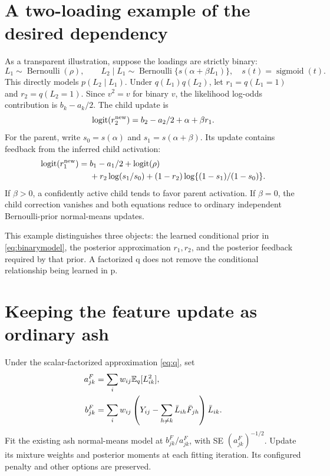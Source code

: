 \documentclass[11pt,a4paper]{article}
\newcommand{\E}{\mathbb E}
\newcommand{\sigmoid}{\operatorname{sigmoid}}
\newcommand{\logit}{\operatorname{logit}}
\begin{document}
\clearpage
\section{A two-loading example of the desired dependency}
As a transparent illustration, suppose the loadings are strictly binary:
\begin{equation}
L_1\sim\operatorname{Bernoulli}(\rho),\qquad
L_2\mid L_1\sim\operatorname{Bernoulli}\{s(\alpha+\beta L_1)\},
\quad s(t)=\sigmoid(t).
\label{eq:binarymodel}
\end{equation}
This directly models \(p(L_2\mid L_1)\). Under
\(q(L_1)q(L_2)\), let \(r_1=q(L_1=1)\) and \(r_2=q(L_2=1)\).
Since \(v^2=v\) for binary \(v\), the likelihood log-odds contribution
is \(b_k-a_k/2\). The child update is
\begin{equation}
\logit(r_2^{\rm new})=b_2-a_2/2+\alpha+\beta r_1.
\label{eq:binarychild}
\end{equation}
For the parent, write \(s_0=s(\alpha)\) and \(s_1=s(\alpha+\beta)\).
Its update contains feedback from the inferred child activation:
\begin{align}
\logit(r_1^{\rm new})
={}&b_1-a_1/2+\logit(\rho)\notag\\
&+r_2\log(s_1/s_0)+(1-r_2)\log\{(1-s_1)/(1-s_0)\}.
\label{eq:binaryparent}
\end{align}
If \(\beta>0\), a confidently active child tends to favor parent
activation. If \(\beta=0\), the child correction vanishes and both equations
reduce to ordinary independent Bernoulli-prior normal-means updates.

This example distinguishes three objects: the learned conditional prior
in \eqref{eq:binarymodel}, the posterior approximation \(r_1,r_2\), and the
posterior feedback required by that prior. A factorized q does not remove
the conditional relationship being learned in p.

\section{Keeping the feature update as ordinary ash}
Under the scalar-factorized approximation \eqref{eq:q}, set
\begin{align}
a^F_{jk}&=\sum_iw_{ij}\E_q[L_{ik}^2],\notag\\
b^F_{jk}&=\sum_iw_{ij}
\left(Y_{ij}-\sum_{h\ne k}\bar L_{ih}\bar F_{jh}\right)\bar L_{ik}.
\label{eq:Fstats}
\end{align}
Fit the existing ash normal-means model at
\(b^F_{jk}/a^F_{jk}\), with SE \((a^F_{jk})^{-1/2}\). Update its mixture
weights and posterior moments at each fitting iteration. Its configured
penalty and other options are preserved.
\end{document}
